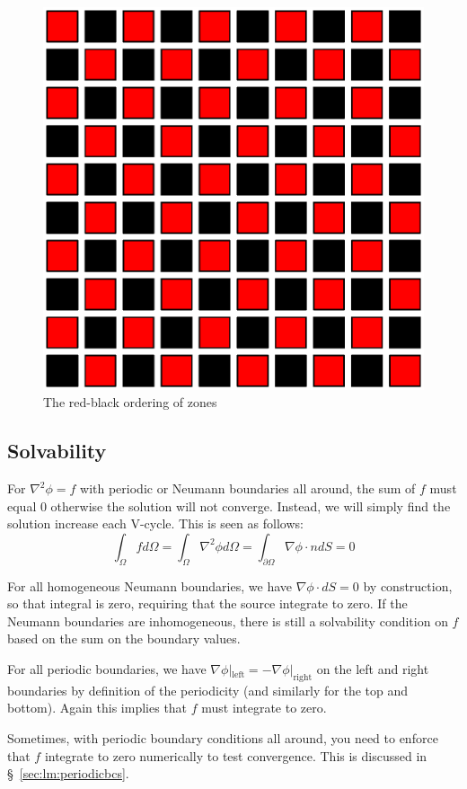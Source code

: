 \begin{figure}[t]
  \centering
  \includegraphics[width=0.6\linewidth]{rb}
  \caption{\label{fig:rb} The red-black ordering of zones}
\end{figure}


\subsection{Solvability}

For $\nabla^2 \phi = f$ with periodic or
Neumann boundaries all around, the sum of $f$ must equal $0$
otherwise the solution will not converge.  Instead, we will simply
find the solution increase each V-cycle.  This is seen as follows:
\begin{equation}
  \int_\Omega f d\Omega = \int_\Omega \nabla^2 \phi d\Omega =
  \int_{\partial \Omega} \nabla \phi \cdot n dS = 0
\end{equation}

For all homogeneous Neumann boundaries, we have $\nabla \phi \cdot dS
= 0$ by construction, so that integral is zero, requiring that the
source integrate to zero.  If the Neumann boundaries are inhomogeneous,
there is still a solvability condition on $f$ based on the sum on
the boundary values.

For all periodic boundaries, we have $\nabla \phi
|_\mathrm{left} = -\nabla \phi |_\mathrm{right}$ on the left and right
boundaries by definition of the periodicity (and similarly for the top
and bottom).  Again this implies that $f$ must integrate to zero.

Sometimes, with periodic boundary conditions all around, you need to
enforce that $f$ integrate to zero numerically to test convergence.
This is discussed in \S~\ref{sec:lm:periodicbcs}.

